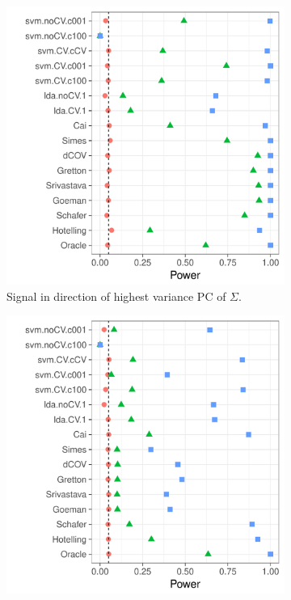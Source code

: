 \documentclass[]{bio}
\begin{document}
\begin{figure}[h]
	\centering
	\begin{subfigure}[t]{.45\columnwidth}
		\centering
		\includegraphics[width=1\columnwidth]{"art/file20"}
		\caption{Signal in direction of highest variance PC of $\Sigma$.} 
		\label{fig:dependence_11}
	\end{subfigure}
	\begin{subfigure}[t]{.45\columnwidth}
		\centering
		\includegraphics[width=1\columnwidth]{"art/file21"}

\end{subfigure}
\end{figure}
\end{document}
